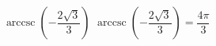  {$\operatorname{arccsc} \left( -\dfrac{2\sqrt{3}}{3} \right)$ }
{ $\operatorname{arccsc} \left( -\dfrac{2\sqrt{3}}{3} \right) = \dfrac{4\pi}{3}$}
